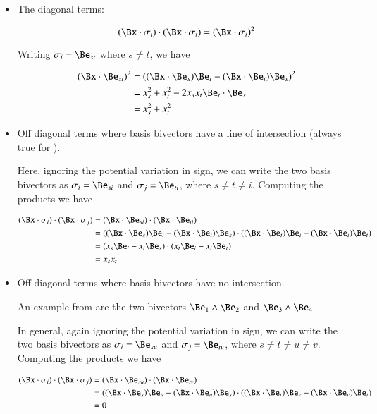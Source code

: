 \begin{itemize}
\item The diagonal terms:

\[
(\Bx \cdot \sigma_i) \cdot (\Bx \cdot \sigma_i) 
= (\Bx \cdot \sigma_i)^2
\]

Writing $\sigma_i = \Be_{st}$ where $s \ne t$, we have

\begin{align*}
(\Bx \cdot \Be_{st})^2
&=
( (\Bx \cdot \Be_s) \Be_t -(\Bx \cdot \Be_t) \Be_s )^2 \\
&=
x_s^2 + x_t^2 - 2 x_s x_t \Be_t \cdot \Be_s \\
&=
x_s^2 + x_t^2
\end{align*}

\item Off diagonal terms where basis bivectors have a line of intersection (always true for ).

Here, ignoring the potential variation in sign, we can write the two basis bivectors as $\sigma_i = \Be_{si}$ and $\sigma_j = \Be_{ti}$, where $s \ne t \ne i$.  Computing the products we have

\begin{align*}
(\Bx \cdot \sigma_i) \cdot (\Bx \cdot \sigma_j)
&= (\Bx \cdot \Be_{si}) \cdot (\Bx \cdot \Be_{ti})  \\
&= ((\Bx \cdot \Be_s) \Be_i - (\Bx \cdot \Be_i) \Be_s) \cdot ((\Bx \cdot \Be_t) \Be_i - (\Bx \cdot \Be_i) \Be_t) \\
&= (x_s \Be_i - x_i \Be_s) \cdot (x_t \Be_i - x_i \Be_t) \\
&= x_s x_t \\
\end{align*}

\item Off diagonal terms where basis bivectors have no intersection.

An example from  are the two bivectors $\Be_1 \wedge \Be_2$ and $\Be_3 \wedge \Be_4$

In general, again ignoring the potential variation in sign, we can write the two basis bivectors as $\sigma_i = \Be_{su}$ and $\sigma_j = \Be_{tv}$, where $s \ne t \ne u \ne v$.  Computing the products we have

\begin{align*}
(\Bx \cdot \sigma_i) \cdot (\Bx \cdot \sigma_j)
&= (\Bx \cdot \Be_{su}) \cdot (\Bx \cdot \Be_{tv})  \\
&= ((\Bx \cdot \Be_s) \Be_u - (\Bx \cdot \Be_u) \Be_s) \cdot ((\Bx \cdot \Be_t) \Be_v - (\Bx \cdot \Be_v) \Be_t) \\
&= 0 \\
\end{align*}

\end{itemize}

